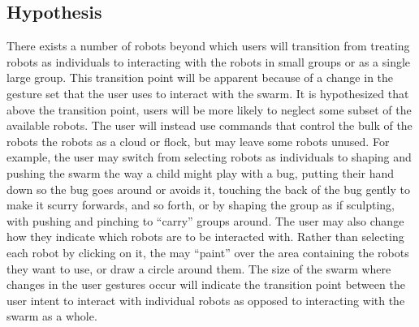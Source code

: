 \documentclass[]{article}
\begin{document}
\subsection{Hypothesis}

There exists a number of robots beyond which users will transition from treating robots as individuals to interacting with the robots in small groups or as a single large group. 
This transition point will be apparent because of a change in the gesture set that the user uses to interact with the swarm. 
It is hypothesized that above the transition point, users will be more likely to neglect some subset of the available robots. 
The user will instead use commands that control the bulk of the robots the robots as a cloud or flock, but may leave some robots unused. 
For example, the user may switch from selecting robots as individuals to shaping and pushing the swarm the way a child might play with a bug, putting their hand down so the bug goes around or avoids it, touching the back of the bug gently to make it scurry forwards, and so forth, or by shaping the group as if sculpting, with pushing and pinching to ``carry'' groups around. 
The user may also change how they indicate which robots are to be interacted with. 
Rather than selecting each robot by clicking on it, the may ``paint'' over the area containing the robots they want to use, or draw a circle around them. 
The size of the swarm where changes in the user gestures occur will indicate the transition point between the user intent to interact with individual robots as opposed to interacting with the swarm as a whole. 
\end{document}
